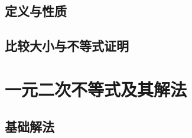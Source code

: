   \subsection{定义与性质}
  \subsection{比较大小与不等式证明}
  \begin{exercise}
    \item
  \end{exercise}
\section{一元二次不等式及其解法}
  \subsection{基础解法}
